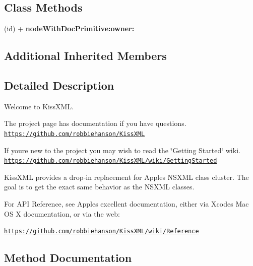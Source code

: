 \subsection*{Class Methods}
\begin{DoxyCompactItemize}
\item 
\hypertarget{interface_d_d_x_m_l_document_af35340e7c287b74dc8e89ec65c57722e}{}(id) + {\bfseries node\+With\+Doc\+Primitive\+:owner\+:}\label{interface_d_d_x_m_l_document_af35340e7c287b74dc8e89ec65c57722e}

\end{DoxyCompactItemize}
\subsection*{Additional Inherited Members}


\subsection{Detailed Description}
Welcome to Kiss\+X\+M\+L.

The project page has documentation if you have questions. \href{https://github.com/robbiehanson/KissXML}{\tt https\+://github.\+com/robbiehanson/\+Kiss\+X\+M\+L}

If you\textquotesingle{}re new to the project you may wish to read the \char`\"{}\+Getting Started\char`\"{} wiki. \href{https://github.com/robbiehanson/KissXML/wiki/GettingStarted}{\tt https\+://github.\+com/robbiehanson/\+Kiss\+X\+M\+L/wiki/\+Getting\+Started}

Kiss\+X\+M\+L provides a drop-\/in replacement for Apple\textquotesingle{}s N\+S\+X\+M\+L class cluster. The goal is to get the exact same behavior as the N\+S\+X\+M\+L classes.

For A\+P\+I Reference, see Apple\textquotesingle{}s excellent documentation, either via Xcode\textquotesingle{}s Mac O\+S X documentation, or via the web\+:

\href{https://github.com/robbiehanson/KissXML/wiki/Reference}{\tt https\+://github.\+com/robbiehanson/\+Kiss\+X\+M\+L/wiki/\+Reference} 

\subsection{Method Documentation}
\hypertarget{interface_d_d_x_m_l_document_ada1a30f2955d3dd07ece93ef8ce6ed5e}{}
